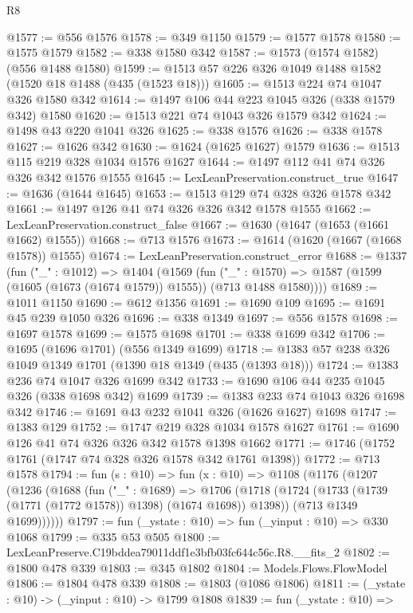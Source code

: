 \begin{lexlean}{R8}
\begin{coremodule}
@1577 := @556 @1576
@1578 := @349 @1150
@1579 := @1577 @1578
@1580 := @1575 @1579
@1582 := @338 @1580 @342
@1587 := @1573 (@1574 @1582) (@556 @1488 @1580)
@1599 := @1513 @57 @226 @326 @1049 @1488 @1582 (@1520 @18 @1488 (@435 (@1523 @18)))
@1605 := @1513 @224 @74 @1047 @326 @1580 @342
@1614 := @1497 @106 @44 @223 @1045 @326 (@338 @1579 @342) @1580
@1620 := @1513 @221 @74 @1043 @326 @1579 @342
@1624 := @1498 @43 @220 @1041 @326
@1625 := @338 @1576
@1626 := @338 @1578
@1627 := @1626 @342
@1630 := @1624 (@1625 @1627) @1579
@1636 := @1513 @115 @219 @328 @1034 @1576 @1627
@1644 := @1497 @112 @41 @74 @326 @326 @342 @1576 @1555
@1645 := LexLeanPreservation.construct_true
@1647 := @1636 (@1644 @1645)
@1653 := @1513 @129 @74 @328 @326 @1578 @342
@1661 := @1497 @126 @41 @74 @326 @326 @342 @1578 @1555
@1662 := LexLeanPreservation.construct_false
@1667 := @1630 (@1647 (@1653 (@1661 @1662) @1555))
@1668 := @713 @1576
@1673 := @1614 (@1620 (@1667 (@1668 @1578)) @1555)
@1674 := LexLeanPreservation.construct_error
@1688 := @1337
    (fun ("_" : @1012) =>
    @1404
      (@1569
        (fun ("_" : @1570) =>
        @1587 (@1599 (@1605 (@1673 (@1674 @1579)) @1555)) (@713 @1488 @1580))))
@1689 := @1011 @1150
@1690 := @612 @1356
@1691 := @1690 @109
@1695 := @1691 @45 @239 @1050 @326
@1696 := @338 @1349
@1697 := @556 @1578
@1698 := @1697 @1578
@1699 := @1575 @1698
@1701 := @338 @1699 @342
@1706 := @1695 (@1696 @1701) (@556 @1349 @1699)
@1718 := @1383 @57 @238 @326 @1049 @1349 @1701 (@1390 @18 @1349 (@435 (@1393 @18)))
@1724 := @1383 @236 @74 @1047 @326 @1699 @342
@1733 := @1690 @106 @44 @235 @1045 @326 (@338 @1698 @342) @1699
@1739 := @1383 @233 @74 @1043 @326 @1698 @342
@1746 := @1691 @43 @232 @1041 @326 (@1626 @1627) @1698
@1747 := @1383 @129
@1752 := @1747 @219 @328 @1034 @1578 @1627
@1761 := @1690 @126 @41 @74 @326 @326 @342 @1578 @1398 @1662
@1771 := @1746 (@1752 @1761 (@1747 @74 @328 @326 @1578 @342 @1761 @1398))
@1772 := @713 @1578
@1794 := fun (s : @10) =>
  fun (x : @10) =>
  @1108
    (@1176
      (@1207
        (@1236
          (@1688
            (fun ("_" : @1689) =>
            @1706
              (@1718 (@1724 (@1733 (@1739 (@1771 (@1772 @1578)) @1398) (@1674 @1698)) @1398))
              (@713 @1349 @1699))))))
@1797 := fun (_ystate : @10) => fun (_yinput : @10) => @330 @1068
@1799 := @335 @53 @505
@1800 := LexLeanPreserve.C19bddea79011ddf1e3bfb03fc644c56c.R8.__fits_2
@1802 := @1800 @478 @339
@1803 := @345 @1802
@1804 := Models.Flows.FlowModel
@1806 := @1804 @478 @339
@1808 := @1803 (@1086 @1806)
@1811 := (_ystate : @10) -> (_yinput : @10) -> @1799 @1808
@1839 := fun (_ystate : @10) =>

\end{coremodule}
\end{lexlean}
